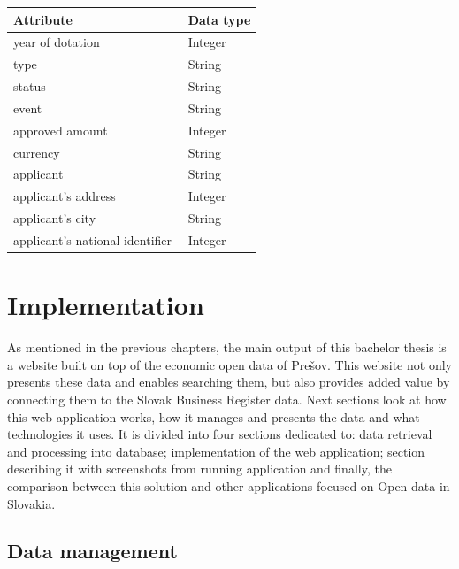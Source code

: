 \documentclass[thesis=B,english]{FITthesis}[2012/06/26]
\begin{document}
    \begin{center}
        \begin{tabular}{  p{0.7\linewidth} | p{0.3\linewidth} }
        Attribute & Data type\\ \hline
        year of dotation & Integer \\
        type & String \\
        status & String \\
        event & String \\
        approved amount & Integer \\
        currency & String \\
        applicant & String \\
        applicant's address & Integer \\
        applicant's city & String \\
        applicant's national identifier & Integer \\
        \end{tabular}
    \end{center}	
	
	\chapter{Implementation}
	As mentioned in the previous chapters, the main output of this bachelor thesis is a website built on top of the economic open data of Prešov. This website not only presents these data and enables searching them, but also provides added value by connecting them to the Slovak Business Register data. Next sections look at how this web application works, how it manages and presents the data and what technologies it uses.   It is divided into four sections dedicated to: data retrieval and processing into database; implementation of the web application; section describing it with screenshots from running application and finally, the comparison between this solution and other applications focused on Open data in Slovakia.
	\section{Data management}
\end{document}
